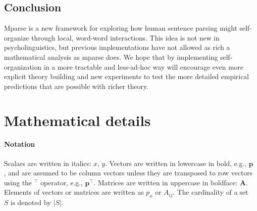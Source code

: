 \documentclass[a4paper, 12pt]{article}
\newcommand{\todo}[1]{\textcolor{red}{\textbf{TODO: #1}}}
\begin{document}


\subsection{Conclusion}
Mparse is a new framework for exploring how human sentence parsing might
self-organize through local, word-word interactions. This idea is not new in
psycholinguistics, but previous implementations have not allowed as rich a
mathematical analysis as mparse does. We hope that by implementing
self-organization in a more tractable and less-ad-hoc way will encourage even
more explicit theory building and new experiments to test the more detailed
empirical predictions that are possible with richer theory.



%
\appendix

\section{Mathematical details}
\paragraph{Notation} Scalars are written in italics: $x$, $y$. Vectors are
written in lowercase in bold, e.g., $\mathbf{p}$, and are assumed to be column
vectors unless they are transposed to row vectors using the $^\intercal$
operator, e.g., $\mathbf{p}^\intercal$. Matrices are written in uppercase in
boldface: $\mathbf{A}$. Elements of vectors or matrices are written as $p_n$ or
$A_{ij}$. The cardinality of a set $S$ is denoted by $|S|$.
\end{document}

